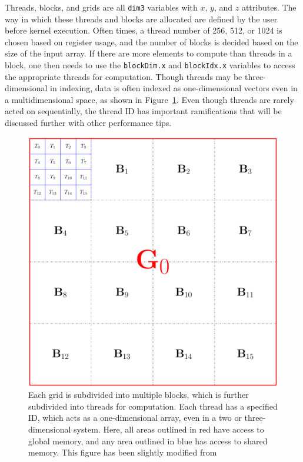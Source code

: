 Threads, blocks, and grids are all \texttt{dim3} variables with $x$, $y$, and $z$ attributes.
The way in which these threads and blocks are allocated are defined by the user before kernel execution.
Often times, a thread number of 256, 512, or 1024 is chosen based on register usage, and the number of blocks is decided based on the size of the input array.
If there are more elements to compute than threads in a block, one then needs to use the \texttt{blockDim.x} and \texttt{blockIdx.x} variables to access the appropriate threads for computation.
Though threads may be three-dimensional in indexing, data is often indexed as one-dimensional vectors even in a multidimensional space, as shown in Figure~\ref{fig:threadsnblocks}.
Even though threads are rarely acted on sequentially, the thread ID has important ramifications that will be discussed further with other performance tips.

\begin{figure}
\includegraphics[width=\textwidth]{data/gpu/gputhreads.pdf}
\caption{Each grid is subdivided into multiple blocks, which is further subdivided into threads for computation. Each thread has a specified ID, which acts as a one-dimensional array, even in a two or three-dimensional system. Here, all areas outlined in red have access to global memory, and any area outlined in blue has access to shared memory.
This figure has been slightly modified from ~\cite{o2017}}
\label{fig:threadsnblocks}
\end{figure}

